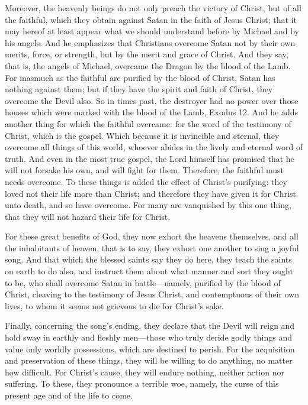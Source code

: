Moreover, the heavenly beings do not only preach the victory of Christ, but of all the faithful, which they obtain against Satan in the faith of Jesus Christ; that it may hereof at least appear what we should understand before by Michael and by his angels. And he emphasizes that Christians overcome Satan not by their own merits, force, or strength, but by the merit and grace of Christ. And they say, that is, the angels of Michael, overcame the Dragon by the blood of the Lamb. For inasmuch as the faithful are purified by the blood of Christ, Satan has nothing against them; but if they have the spirit and faith of Christ, they overcome the Devil also. So in times past, the destroyer had no power over those houses which were marked with the blood of the Lamb, Exodus 12. And he adds another thing for which the faithful overcame: for the word of the testimony of Christ, which is the gospel. Which because it is invincible and eternal, they overcome all things of this world, whoever abides in the lively and eternal word of truth. And even in the most true gospel, the Lord himself has promised that he will not forsake his own, and will fight for them. Therefore, the faithful must needs overcome. To these things is added the effect of Christ’s purifying: they loved not their life more than Christ; and therefore they have given it for Christ unto death, and so have overcome. For many are vanquished by this one thing, that they will not hazard their life for Christ.

For these great benefits of God, they now exhort the heavens themselves, and all the inhabitants of heaven, that is to say, they exhort one another to sing a joyful song. And that which the blessed saints say they do here, they teach the saints on earth to do also, and instruct them about what manner and sort they ought to be, who shall overcome Satan in battle—namely, purified by the blood of Christ, cleaving to the testimony of Jesus Christ, and contemptuous of their own lives, to whom it seems not grievous to die for Christ’s sake.

Finally, concerning the song’s ending, they declare that the Devil will reign and hold sway in earthly and fleshly men—those who truly deride godly things and value only worldly possessions, which are destined to perish. For the acquisition and preservation of these things, they will be willing to do anything, no matter how difficult. For Christ’s cause, they will endure nothing, neither action nor suffering. To these, they pronounce a terrible woe, namely, the curse of this present age and of the life to come.

